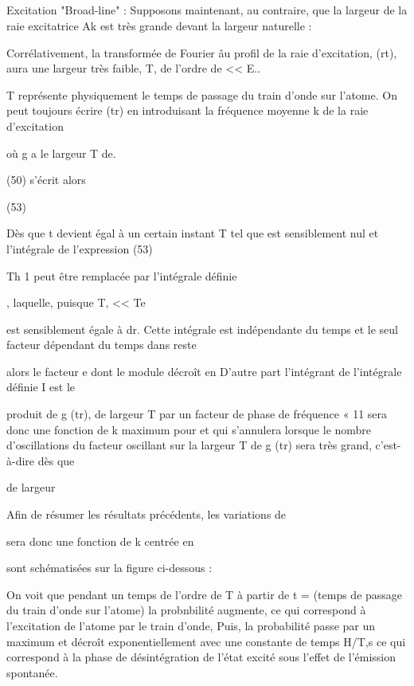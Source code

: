 \subsection{} Excitation "Broad-line" :%
Supposons maintenant, au contraire, que la largeur de la raie
excitatrice Ak est très grande devant la largeur naturelle :

Corrélativement, la transformée de Fourier âu profil de la raie
d'excitation, (rt), aura une largeur très faible, T, de l'ordre de  << E..

T représente physiquement le temps de passage du train d'onde sur l'atome.
On peut toujours écrire  (tr) en introduisant la fréquence
moyenne k de la raie d'excitation

où g a le largeur T de.

(50) s'écrit alors

(53)

Dès que t devient égal à un certain instant T tel que
 est sensiblement nul et l'intégrale de l'expression (53)



Th 1
peut être remplacée par l'intégrale définie

, laquelle, puisque T, << Te

est sensiblement égale à
dr. Cette intégrale est indépendante
du temps et le seul facteur dépendant du temps dans reste

alors le facteur e dont le module décroît en
D'autre part l'intégrant de l'intégrale définie I est le

produit de g (tr), de largeur T par un facteur de phase de fréquence
 « 11 sera donc une fonction de k maximum pour 
et qui s'annulera lorsque le nombre d'oscillations du facteur oscillant sur la
largeur T de g (tr) sera très grand, c'est-à-dire dès que

 de largeur

Afin de résumer les résultats précédents, les variations de

sera donc une fonction de k centrée en

sont schématisées sur la figure ci-dessous :

On voit que pendant un temps de l'ordre de T à partir de t =
(temps de passage du train d'onde sur l'atome) la probnbilité augmente, ce
qui correspond à l'excitation de l'atome par le train d'onde, Puis, la probabilité passe par un maximum et décroît exponentiellement avec une constante de
temps H/T,s ce qui correspond à la phase de désintégration de l'état excité
sous l'effet de l'émission spontanée.


